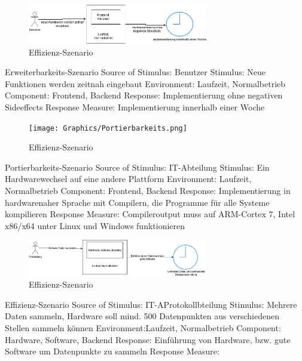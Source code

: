 \begin{figure}[tbh]
  \centering
  \includegraphics[width=0.7\textwidth]{Graphics/Erweiterbarkeit.png}
  \caption{Effizienz-Szenario}
  \label{fig:Qualitaet3}
\end{figure}


Erweiterbarkeits-Szenario
Source of Stimulus: Benutzer
Stimulus: Neue Funktionen werden zeitnah eingebaut
Environment: Laufzeit, Normalbetrieb
Component: Frontend, Backend
Response: Implementierung ohne negativen Sideeffects
Response Measure: Implementierung innerhalb einer Woche 



\begin{figure}[tbh]
  \centering
  \texttt{[image: Graphics/Portierbarkeits.png]}
  \caption{Effizienz-Szenario}
  \label{fig:Qualitaet4}
\end{figure}



Portierbarkeits-Szenario
Source of Stimulus: IT-Abteilung
Stimulus: Ein Hardwarewechsel auf eine andere Plattform
Environment: Laufzeit, Normalbetrieb
Component: Frontend, Backend
Response: Implementierung in hardwarenaher Sprache mit Compilern, die Programme für alle Systeme kompilieren 
Response Measure: Compileroutput muss auf ARM-Cortex 7, Intel x86/x64 unter Linux und Windows funktionieren




\begin{figure}[tbh]
  \centering
  \includegraphics[width=0.7\textwidth]{Graphics/Effizienz.png}
  \caption{Effizienz-Szenario}
  \label{fig:Qualitaet5}
\end{figure}



Effizienz-Szenario
Source of Stimulus: IT-AProtokollbteilung
Stimulus: Mehrere Daten sammeln, Hardware soll mind. 500 Datenpunkten aus verschiedenen Stellen sammeln können
Environment:Laufzeit, Normalbetrieb
Component: Hardware, Software, Backend
Response: Einführung von Hardware, bzw. gute Software um Datenpunkte zu sammeln
Response Measure: 




